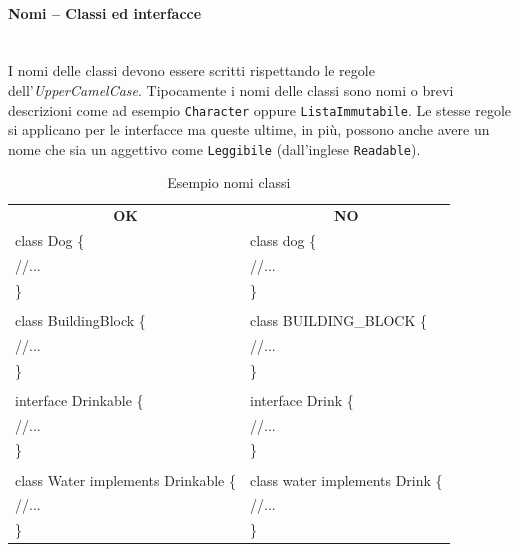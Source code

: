 \paragraph{Nomi – Classi ed interfacce}\mbox{}\\[0.4cm]
I nomi delle classi devono essere scritti rispettando le regole dell’\emph{UpperCamelCase}. Tipocamente i nomi delle classi sono nomi o brevi descrizioni come ad esempio \texttt{Character} oppure \texttt{ListaImmutabile}. Le stesse regole si applicano per le interfacce ma queste ultime, in più, possono anche avere un nome che sia un aggettivo come \texttt{Leggibile} (dall’inglese \texttt{Readable}).
\begin{table} [H]
	\begin{center}
		\begin{tabular}{  l | l }
			\multicolumn{1}{c}{\textbf{OK}}&\multicolumn{1}{c}{\textbf{NO}}\\ 
			
			class Dog \{
			& class dog \{ \\
			\hspace{0.5cm}//...
			& \hspace{0.5cm}//... \\
			\}
			& \} \\
			&\\
			class BuildingBlock \{
			& class BUILDING\_BLOCK \{\\
			\hspace{0.5cm}//...
			& \hspace{0.5cm}//...\\
			\}
			&\}\\
			&\\
			interface Drinkable \{
			& interface Drink \{\\
			\hspace{0.5cm}//...
			& \hspace{0.5cm}//...\\
			\}
			& \}\\
			&\\
			class Water implements Drinkable \{
			& class water implements Drink \{ \\
			\hspace{0.5cm}//...									& \hspace{0.5cm}//...\\
			\}
			& \}\\		
		\end{tabular}
	\end{center}
	\caption{Esempio nomi classi}
\end{table}
	
